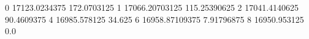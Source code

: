 0 17123.0234375 172.0703125
1 17066.20703125 115.25390625
2 17041.4140625 90.4609375
4 16985.578125 34.625
6 16958.87109375 7.91796875
8 16950.953125 0.0
